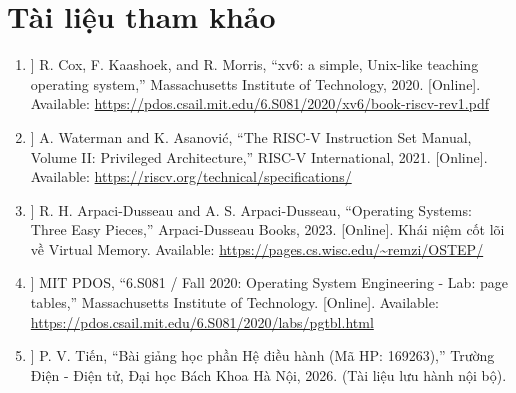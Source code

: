 \chapter*{Tài liệu tham khảo}

\begin{enumerate}
    \item[ [1] ] R. Cox, F. Kaashoek, and R. Morris, ``xv6: a simple, Unix-like teaching operating system,'' Massachusetts Institute of Technology, 2020. [Online]. Available: \url{https://pdos.csail.mit.edu/6.S081/2020/xv6/book-riscv-rev1.pdf}
    
    \item[ [2] ] A. Waterman and K. Asanović, ``The RISC-V Instruction Set Manual, Volume II: Privileged Architecture,'' RISC-V International, 2021. [Online]. Available: \url{https://riscv.org/technical/specifications/}
    
    \item[ [3] ] R. H. Arpaci-Dusseau and A. S. Arpaci-Dusseau, ``Operating Systems: Three Easy Pieces,'' Arpaci-Dusseau Books, 2023. [Online]. Khái niệm cốt lõi về Virtual Memory. Available: \url{https://pages.cs.wisc.edu/~remzi/OSTEP/}
    
    \item[ [4] ] MIT PDOS, ``6.S081 / Fall 2020: Operating System Engineering - Lab: page tables,'' Massachusetts Institute of Technology. [Online]. Available: \url{https://pdos.csail.mit.edu/6.S081/2020/labs/pgtbl.html}
    
    \item[ [5] ] P. V. Tiến, ``Bài giảng học phần Hệ điều hành (Mã HP: 169263),'' Trường Điện - Điện tử, Đại học Bách Khoa Hà Nội, 2026. (Tài liệu lưu hành nội bộ).
\end{enumerate}